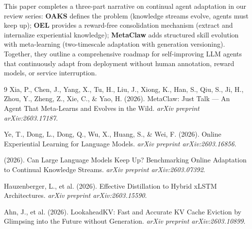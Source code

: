 \documentclass[11pt]{article}
\begin{document}
This paper completes a three-part narrative on continual agent adaptation in our review series:
\textbf{OAKS} defines the problem (knowledge streams evolve, agents must keep up);
\textbf{OEL} provides a reward-free consolidation mechanism (extract and internalize experiential knowledge);
\textbf{MetaClaw} adds structured skill evolution with meta-learning (two-timescale adaptation with generation versioning).
Together, they outline a comprehensive roadmap for self-improving LLM agents that continuously adapt from deployment without human annotation, reward models, or service interruption.

\begin{thebibliography}{9}
 Xia, P., Chen, J., Yang, X., Tu, H., Liu, J., Xiong, K., Han, S., Qiu, S., Ji, H., Zhou, Y., Zheng, Z., Xie, C., \& Yao, H. (2026). MetaClaw: Just Talk --- An Agent That Meta-Learns and Evolves in the Wild. \textit{arXiv preprint arXiv:2603.17187}.

 Ye, T., Dong, L., Dong, Q., Wu, X., Huang, S., \& Wei, F. (2026). Online Experiential Learning for Language Models. \textit{arXiv preprint arXiv:2603.16856}.

 (2026). Can Large Language Models Keep Up? Benchmarking Online Adaptation to Continual Knowledge Streams. \textit{arXiv preprint arXiv:2603.07392}.

 Hauzenberger, L., et al. (2026). Effective Distillation to Hybrid xLSTM Architectures. \textit{arXiv preprint arXiv:2603.15590}.

 Ahn, J., et al. (2026). LookaheadKV: Fast and Accurate KV Cache Eviction by Glimpsing into the Future without Generation. \textit{arXiv preprint arXiv:2603.10899}.
\end{thebibliography}
\end{document}
